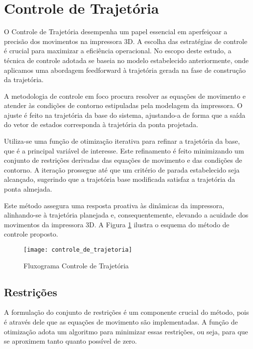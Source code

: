 \section{Controle de Trajetória}
O Controle de Trajetória desempenha um papel essencial em aperfeiçoar a precisão dos movimentos na impressora 3D. A escolha das estratégias de controle é crucial para maximizar a eficiência operacional. No escopo deste estudo, a técnica de controle adotada se baseia no modelo estabelecido anteriormente, onde aplicamos uma abordagem feedforward à trajetória gerada na fase de construção da trajetória.

A metodologia de controle em foco procura resolver as equações de movimento e atender às condições de contorno estipuladas pela modelagem da impressora. O ajuste é feito na trajetória da base do sistema, ajustando-a de forma que a saída do vetor de estados corresponda à trajetória da ponta projetada.

Utiliza-se uma função de otimização iterativa para refinar a trajetória da base, que é a principal variável de interesse. Este refinamento é feito minimizando um conjunto de restrições derivadas das equações de movimento e das condições de contorno. A iteração prossegue até que um critério de parada estabelecido seja alcançado, sugerindo que a trajetória base modificada satisfaz a trajetória da ponta almejada.

Este método assegura uma resposta proativa às dinâmicas da impressora, alinhando-se à trajetória planejada e, consequentemente, elevando a acuidade dos movimentos da impressora 3D. A Figura \ref{fig:controle_de_trajetoria} ilustra o esquema do método de controle proposto.

\begin{figure}[H]
    \centering
    \caption{Fluxograma Controle de Trajetória}
    \texttt{[image: controle\_de\_trajetoria]}

    \label{fig:controle_de_trajetoria}
\end{figure}

\subsection{Restrições}

A formulação do conjunto de restrições é um componente crucial do método, pois é através dele que as equações de movimento são implementadas. A função de otimização adota um algoritmo para minimizar essas restrições, ou seja, para que se aproximem tanto quanto possível de zero.

